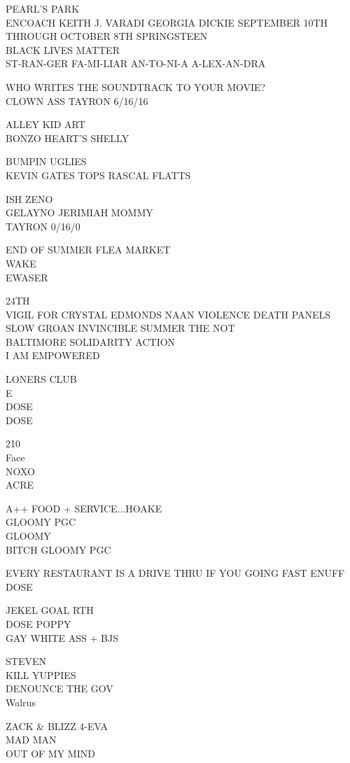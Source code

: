 \documentclass[10pt,letterpaper]{article}
\begin{document}
PEARL'S PARK\\
ENCOACH KEITH J. VARADI GEORGIA DICKIE SEPTEMBER 10TH THROUGH OCTOBER 8TH SPRINGSTEEN\\
BLACK LIVES MATTER\\
ST{-}RAN{-}GER FA{-}MI{-}LIAR AN{-}TO{-}NI{-}A A{-}LEX{-}AN{-}DRA

WHO WRITES THE SOUNDTRACK TO YOUR MOVIE?\\
CLOWN ASS TAYRON 6/16/16

ALLEY KID ART\\
BONZO HEART'S SHELLY

BUMPIN UGLIES\\
KEVIN GATES TOPS RASCAL FLATTS

ISH ZENO\\
GELAYNO JERIMIAH MOMMY\\
TAYRON 0/16/0

END OF SUMMER FLEA MARKET\\
WAKE\\
EWASER

24TH\\
VIGIL FOR CRYSTAL EDMONDS NAAN VIOLENCE DEATH PANELS SLOW GROAN INVINCIBLE SUMMER THE NOT\\
BALTIMORE SOLIDARITY ACTION\\
I AM EMPOWERED

LONERS CLUB\\
E\\
DOSE\\
DOSE

210\\
Face\\
NOXO\\
ACRE

A++ FOOD + SERVICE...HOAKE\\
GLOOMY PGC\\
GLOOMY\\
BITCH GLOOMY PGC

EVERY RESTAURANT IS A DRIVE THRU IF YOU GOING FAST ENUFF\\
DOSE

JEKEL GOAL RTH\\
DOSE POPPY\\
GAY WHITE ASS + BJS

STEVEN\\
KILL YUPPIES\\
DENOUNCE THE GOV\\
Walrus

ZACK \& BLIZZ 4{-}EVA\\
MAD MAN\\
OUT OF MY MIND
\end{document}
